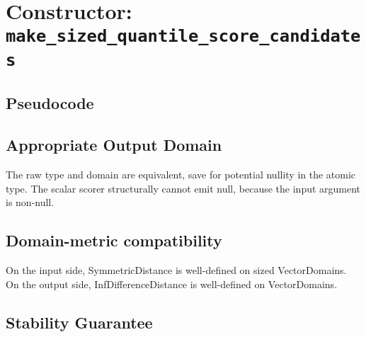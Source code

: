 \documentclass{article}
\begin{document}
% 

\section{Constructor: \texttt{make\_sized\_quantile\_score\_candidates}}

\subsection{Pseudocode}
\label{sec:sized-python-pseudocode}


\subsection{Appropriate Output Domain}
The raw type and domain are equivalent, save for potential nullity in the atomic type. 
The scalar scorer structurally cannot emit null, because the input argument is non-null.

\subsection{Domain-metric compatibility}
On the input side, SymmetricDistance is well-defined on sized VectorDomains. 
On the output side, InfDifferenceDistance is well-defined on VectorDomains.

\subsection{Stability Guarantee}
\end{document}
